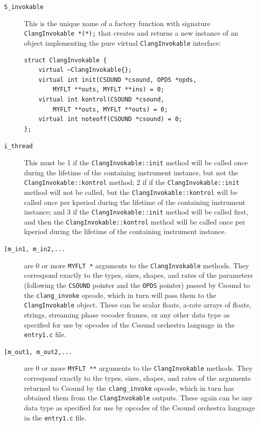 \documentclass[letterpaper, 12pt]{article}
\begin{document}
\begin{description}
\item[\texttt{S\_invokable}] This is the unique name of a factory function with signature \verb|ClangInvokable *(*);| that creates and returns a new instance of an object implementing the pure virtual \verb|ClangInvokable| interface:

\begin{Verbatim}[fontfamily=courier, xleftmargin=\parindent]
struct ClangInvokable {
	virtual ~ClangInvokable{};
	virtual int init(CSOUND *csound, OPDS *opds, 
		MYFLT **outs, MYFLT **ins) = 0;
	virtual int kontrol(CSOUND *csound, 
		MYFLT **outs, MYFLT **outs) = 0;
	virtual int noteoff(CSOUND *csound) = 0;
};
\end{Verbatim}

\item[\texttt{i\_thread}] This must be 1 if the \verb|ClangInvokable::init| method will be called once during the lifetime of the containing instrument instance, but not the \verb|ClangInvokable::kontrol| method; 2 if if the \verb|ClangInvokable::init| method will not be called, but the \verb|ClangInvokable::kontrol| will be called once per kperiod during the lifetime of the containing instrument instance; and 3 if the \verb|ClangInvokable::init| method will be called first, and then the \verb|ClangInvokable::kontrol| method will be called once per kperiod during the lifetime of the containing instrument instance.
\item[\texttt{[m\_in1, m\_in2,...}] are 0 or more \verb|MYFLT *| arguments to the \verb|ClangInvokable| methods. They correspond exactly to the types, sizes, shapes, and rates of the parameters (following the \verb|CSOUND| pointer and the \verb|OPDS| pointer) passed by Csound to the \verb|clang_invoke| opcode, which in turn will pass them to the \verb|ClangInvokable| object. These can be scalar floats, a-rate arrays of floats, strings, streaming phase vocoder frames, or any other data type as specified for use by opcodes of the Csound orchestra language in the \verb|entry1.c| \citep{entry1} file.
\item[\texttt{[m\_out1, m\_out2,...}] are 0 or more \verb|MYFLT **| arguments to the \verb|ClangInvokable| methods. They correspond exactly to the types, sizes, shapes, and rates of the arguments returned to Csound by the \verb|clang_invoke| opcode, which in turn has obtained them from the \verb|ClangInvokable| outputs. These again can be any data type as specified for use by opcodes of the Csound orchestra language in the \verb|entry1.c| \citep{entry1} file.
\end{description}
\end{document}
